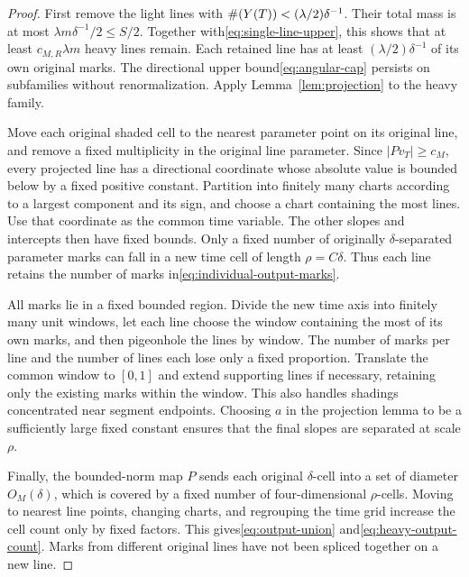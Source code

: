 \begin{proof}
First remove the light lines with $\#\!\left(Y(T)\right)<(\lambda/2)\delta^{-1}$.
Their total mass is at most $\lambda m\delta^{-1}/2\le S/2$.
Together with\eqref{eq:single-line-upper}, this shows that at least $c_{M,R}\lambda m$ heavy lines remain.
Each retained line has at least $(\lambda/2)\delta^{-1}$ of its own original marks.
The directional upper bound\eqref{eq:angular-cap} persists on subfamilies without renormalization.
Apply Lemma~\ref{lem:projection} to the heavy family.

Move each original shaded cell to the nearest parameter point on its original line,
and remove a fixed multiplicity in the original line parameter.
Since $|Pv_T|\ge c_M$, every projected line has a directional coordinate whose absolute value is bounded below by a fixed positive constant.
Partition into finitely many charts according to a largest component and its sign, and choose a chart containing the most lines.
Use that coordinate as the common time variable. The other slopes and intercepts then have fixed bounds.
Only a fixed number of originally $\delta$-separated parameter marks can fall in a new time cell of length $\rho=C\delta$.
Thus each line retains the number of marks in\eqref{eq:individual-output-marks}.

All marks lie in a fixed bounded region. Divide the new time axis into finitely many unit windows,
let each line choose the window containing the most of its own marks,
and then pigeonhole the lines by window.
The number of marks per line and the number of lines each lose only a fixed proportion.
Translate the common window to $[0,1]$ and extend supporting lines if necessary, retaining only the existing marks within the window.
This also handles shadings concentrated near segment endpoints.
Choosing $a$ in the projection lemma to be a sufficiently large fixed constant ensures that the final slopes are separated at scale $\rho$.

Finally, the bounded-norm map $P$ sends each original $\delta$-cell into a set of diameter $O_M(\delta)$,
which is covered by a fixed number of four-dimensional $\rho$-cells.
Moving to nearest line points, changing charts, and regrouping the time grid increase the cell count only by fixed factors.
This gives\eqref{eq:output-union} and\eqref{eq:heavy-output-count}.
Marks from different original lines have not been spliced together on a new line.
\end{proof}
